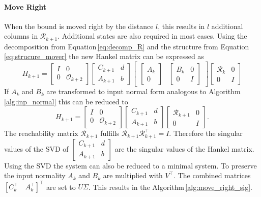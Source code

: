 \documentclass[numbers=noenddot,doctype=mastersthesis,BCOR=15mm,biblatex]{ldvbook}%
\newcommand{\R}{\mathcal{R}} %
\newcommand{\Ob}{\mathcal{O}} %
\newcommand{\eye}{I} %
\begin{document}
\paragraph{Move Right}
When the bound is moved right by the distance $l$, this results in $l$ additional columns in $\R_{k+1}$.
Additional states are also required in most cases.
Using the decomposition from Equation\,\ref{eq:decomp_R} and the structure from Equation\,\ref{eq:strucure_mover} the new Hankel matrix can be expressed as
\begin{equation}
	H_{k+1} = 
	\begin{bmatrix}
	\eye & 0\\ 0 &\Ob_{k+2}
	\end{bmatrix}
	\begin{bmatrix}
	C_{k+1} & d\\
	A_{k+1} & b
	\end{bmatrix}
	\begin{bmatrix}
	\begin{bmatrix}
	A_{k} \\
	0
	\end{bmatrix}&
	\begin{bmatrix}
		B_{k}&0\\
		0&\eye
	\end{bmatrix}
	\end{bmatrix}
	\begin{bmatrix}
	\R_{k} & 0\\ 0& \eye
	\end{bmatrix}
\end{equation}
If $A_{k}$ and $B_{k}$ are transformed to input normal form analogous to Algorithm\,\ref{alg:inp_normal} this can be reduced to 
\begin{equation}
H_{k+1} = 
\begin{bmatrix}
\eye & 0\\ 0 &\Ob_{k+2}
\end{bmatrix}
\begin{bmatrix}
C_{k+1} & d\\
A_{k+1} & b
\end{bmatrix}
\begin{bmatrix}
\R_{k+1} & 0\\ 0& \eye
\end{bmatrix}
.
\end{equation}
The reachability matrix $\R_{k+1}$ fulfills $\R_{k+1} \R_{k+1}^\top = \eye$.
Therefore the singular values of the SVD of $\begin{bmatrix}
	C_{k+1} & d\\
	A_{k+1} & b
\end{bmatrix}$ are the singular values of the Hankel matrix.
Using the SVD the system can also be reduced to a minimal system. 
To preserve the input normality $A_{k}$ and $B_{k}$ are multiplied with $V^\top$. The combined matrices $[C_k^\top \quad A_k^\top]^\top$ are set to $U \Sigma$.
This results in the Algorithm\,\ref{alg:move_right_sig}.
\end{document}
